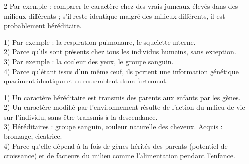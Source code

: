 \begin{multicols}{2}
Par exemple : comparer le caractère chez des vrais jumeaux élevés dans des milieux
différents ; s'il reste identique malgré des milieux différents, il est probablement
héréditaire.

1) Par exemple : la respiration pulmonaire, le squelette interne.\\
2) Parce qu'ils sont présents chez tous les individus humains, sans exception.\\
3) Par exemple : la couleur des yeux, le groupe sanguin.\\
4) Parce qu'étant issus d'un même \oe uf, ils portent une information génétique quasiment
identique et se ressemblent donc fortement.

1) Un caractère héréditaire est transmis des parents aux enfants par les gènes.\\
2) Un caractère modifié par l'environnement résulte de l'action du milieu de vie sur
l'individu, sans être transmis à la descendance.\\
3) Héréditaires : groupe sanguin, couleur naturelle des cheveux. Acquis : bronzage,
cicatrice.\\
4) Parce qu'elle dépend à la fois de gènes hérités des parents (potentiel de
croissance) et de facteurs du milieu comme l'alimentation pendant l'enfance.

\end{multicols}
\exercicesBanner
